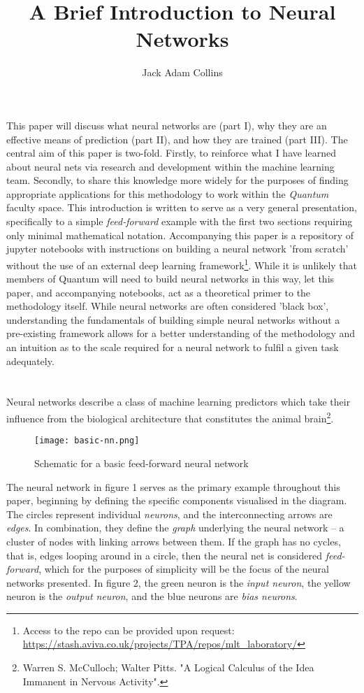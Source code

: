 \documentclass[11pt]{article}
\title{A Brief Introduction to Neural Networks}
\author{Jack Adam Collins}
\date{}
\begin{document}
\maketitle

This paper will discuss what neural networks are (part I), why they are an effective means of prediction (part II), and how they are trained (part III). The central aim of this paper is two-fold. Firstly, to reinforce what I have learned about neural nets via research and development within the machine learning team. Secondly, to share this knowledge more widely for the purposes of finding appropriate applications for this methodology to work within the \textit{Quantum} faculty space. This introduction is written to serve as a very general presentation, specifically to a simple \textit{feed-forward} example with the first two sections requiring only minimal mathematical notation. Accompanying this paper is a repository of jupyter notebooks with instructions on building a neural network 'from scratch' without the use of an external deep learning framework\footnote{Access to the repo can be provided upon request: \url{https://stash.aviva.co.uk/projects/TPA/repos/mlt_laboratory/}}. While it is unlikely that members of Quantum will need to build neural networks in this way, let this paper, and accompanying notebooks, act as a theoretical primer to the methodology itself. While neural networks are often considered 'black box', understanding the fundamentals of building simple neural networks without a pre-existing framework allows for a better understanding of the methodology and an intuition as to the scale required for a neural network to fulfil a given task adequately.
\section{}


Neural networks describe a class of machine learning predictors which take their influence from the biological architecture that constitutes the animal brain\footnote{Warren S. McCulloch; Walter Pitts. "A Logical Calculus of the Idea Immanent in Nervous Activity".}. 

\begin{figure}[h]
    \centering
    \texttt{[image: basic-nn.png]}
    \caption{Schematic for a basic feed-forward neural network}   
\end{figure}

The neural network in figure 1 serves as the primary example throughout this paper, beginning by defining the specific components visualised in the diagram. The circles represent individual \textit{neurons}, and the interconnecting arrows are \textit{edges}. In combination, they define the \textit{graph} underlying the neural network – a cluster of nodes with linking arrows between them. If the graph has no cycles, that is, edges looping around in a circle, then the neural net is considered \textit{feed-forward}, which for the purposes of simplicity will be the focus of the neural networks presented. In figure 2, the green neuron is the \textit{input neuron}, the yellow neuron is the \textit{output neuron}, and the blue neurons are \textit{bias neurons}.
\end{document}
